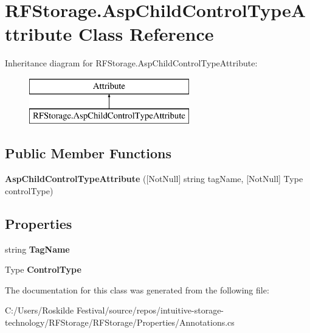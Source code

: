 \section{R\+F\+Storage.\+Asp\+Child\+Control\+Type\+Attribute Class Reference}
\label{class_r_f_storage_1_1_asp_child_control_type_attribute}
Inheritance diagram for R\+F\+Storage.\+Asp\+Child\+Control\+Type\+Attribute\+:\begin{figure}[H]
\begin{center}
\leavevmode
\includegraphics[height=2.000000cm]{class_r_f_storage_1_1_asp_child_control_type_attribute}
\end{center}
\end{figure}
\subsection*{Public Member Functions}
\begin{DoxyCompactItemize}
\item 
\mbox{\label{class_r_f_storage_1_1_asp_child_control_type_attribute_a8485de61e09d066718f447254c2a5dbc}} 
{\bfseries Asp\+Child\+Control\+Type\+Attribute} ([Not\+Null] string tag\+Name, [Not\+Null] Type control\+Type)
\end{DoxyCompactItemize}
\subsection*{Properties}
\begin{DoxyCompactItemize}
\item 
\mbox{\label{class_r_f_storage_1_1_asp_child_control_type_attribute_af6a5c14d9d185ee9648c919efc065d1b}} 
string {\bfseries Tag\+Name}\hspace{0.3cm}{\ttfamily  [get]}
\item 
\mbox{\label{class_r_f_storage_1_1_asp_child_control_type_attribute_a4815bb28e6242994d2f1b2c84177b846}} 
Type {\bfseries Control\+Type}\hspace{0.3cm}{\ttfamily  [get]}
\end{DoxyCompactItemize}


The documentation for this class was generated from the following file\+:\begin{DoxyCompactItemize}
\item 
C\+:/\+Users/\+Roskilde Festival/source/repos/intuitive-\/storage-\/technology/\+R\+F\+Storage/\+R\+F\+Storage/\+Properties/Annotations.\+cs\end{DoxyCompactItemize}
